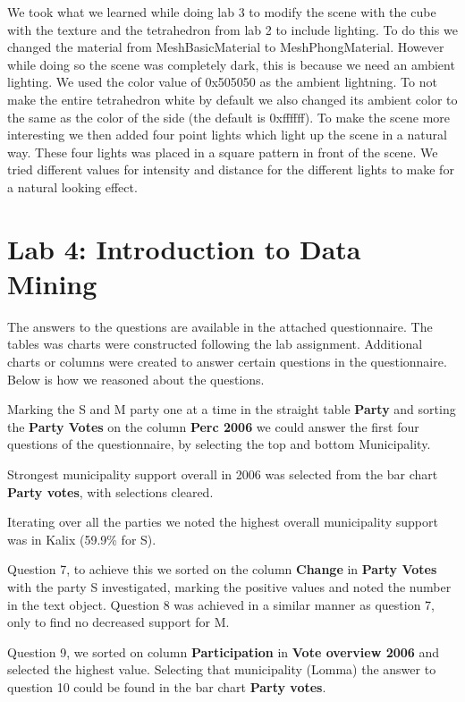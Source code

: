 \documentclass[a4paper]{article}
\begin{document}
We took what we learned while doing lab 3 to modify the scene with the cube with
the texture and the tetrahedron from lab 2 to include lighting. To do this we changed the
material from MeshBasicMaterial to MeshPhongMaterial. However while doing so the
scene was completely dark, this is because we need an ambient lighting. We used
the color value of 0x505050 as the ambient lightning. To not make the entire
tetrahedron white by default we also changed its ambient color to the same as
the color of the side (the default is 0xffffff). To make the scene more
interesting we then added four point lights which light up the scene in a
natural way. These four lights was placed in a square pattern in front of the
scene. We tried different values for intensity and distance for the different
lights to make for a natural looking effect.

\newpage
\section{Lab 4: Introduction to Data Mining}
The answers to the questions are available in the attached questionnaire. The
tables was charts were constructed following the lab assignment. Additional
charts or columns were created to answer certain questions in the questionnaire.
Below is how we reasoned about the questions.

Marking the S and M party one at a time in the straight table \textbf{Party} and
sorting the \textbf{Party Votes} on the column \textbf{Perc 2006} we could
answer the first four questions of the questionnaire, by selecting the top and
bottom Municipality.

Strongest municipality support overall in 2006 was selected from the bar chart
\textbf{Party votes}, with selections cleared.

Iterating over all the parties we noted the highest overall municipality support
was in Kalix (59.9\% for S).

Question 7, to achieve this we sorted on the column \textbf{Change} in
\textbf{Party Votes} with the party S investigated, marking the positive values
and noted the number in the text object.  Question 8 was achieved in a similar
manner as question 7, only to find no decreased support for M.

Question 9, we sorted on column \textbf{Participation} in \textbf{Vote overview
2006} and selected the highest value. Selecting that municipality (Lomma) the
answer to question 10 could be found in the bar chart \textbf{Party votes}.
\end{document}
